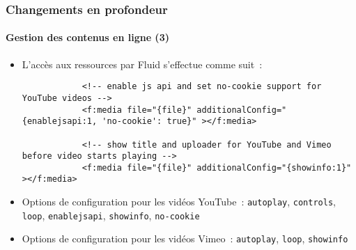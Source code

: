 \begin{frame}[fragile]
	\frametitle{Changements en profondeur}
	\framesubtitle{Gestion des contenus en ligne (3)}

	\lstset{basicstyle=\tiny\ttfamily}

	\begin{itemize}

		\item L'accès aux ressources par Fluid s'effectue comme suit~:

		\begin{lstlisting}
			<!-- enable js api and set no-cookie support for YouTube videos -->
			<f:media file="{file}" additionalConfig="{enablejsapi:1, 'no-cookie': true}" ></f:media>

			<!-- show title and uploader for YouTube and Vimeo before video starts playing -->
			<f:media file="{file}" additionalConfig="{showinfo:1}" ></f:media>
		\end{lstlisting}

		\item Options de configuration pour les vidéos YouTube~:\newline
			\small
				\texttt{autoplay}, \texttt{controls}, \texttt{loop}, \texttt{enablejsapi}, \texttt{showinfo}, \texttt{no-cookie}
			\normalsize

		\item Options de configuration pour les vidéos Vimeo~:\newline
			\small
				\texttt{autoplay}, \texttt{loop}, \texttt{showinfo}
			\normalsize
	\end{itemize}

\end{frame}



